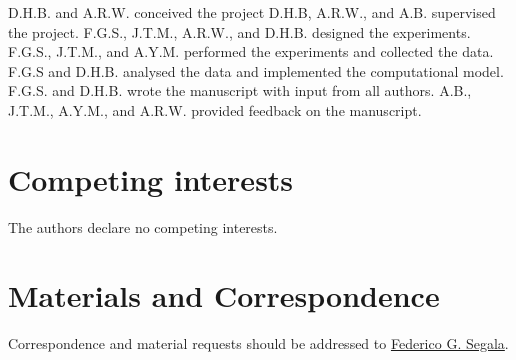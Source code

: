 \documentclass[
]{article}
\begin{document}
D.H.B. and A.R.W. conceived the project D.H.B, A.R.W., and A.B. supervised the project. F.G.S., J.T.M., A.R.W., and D.H.B. designed the experiments. F.G.S., J.T.M., and A.Y.M. performed the experiments and collected the data. F.G.S and D.H.B. analysed the data and implemented the computational model. F.G.S. and D.H.B. wrote the manuscript with input from all authors. A.B., J.T.M., A.Y.M., and A.R.W. provided feedback on the manuscript.

\hypertarget{competing-interests}{%
\section{Competing interests}\label{competing-interests}}

The authors declare no competing interests.

\hypertarget{materials-and-correspondence}{%
\section{Materials and Correspondence}\label{materials-and-correspondence}}

Correspondence and material requests should be addressed to \href{federico.segala@york.ac.uk}{Federico G. Segala}.
\end{document}
